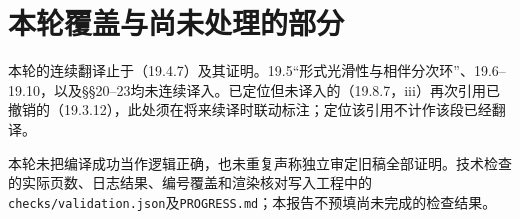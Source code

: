 \section*{本轮覆盖与尚未处理的部分}
本轮的连续翻译止于（19.4.7）及其证明。19.5“形式光滑性与相伴分次环”、19.6--19.10，以及§§20--23均未连续译入。已定位但未译入的（19.8.7，iii）再次引用已撤销的（19.3.12），此处须在将来续译时联动标注；定位该引用不计作该段已经翻译。

本轮未把编译成功当作逻辑正确，也未重复声称独立审定旧稿全部证明。技术检查的实际页数、日志结果、编号覆盖和渲染核对写入工程中的\texttt{checks/validation.json}及\texttt{PROGRESS.md}；本报告不预填尚未完成的检查结果。
